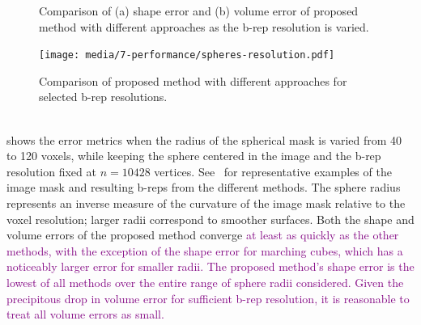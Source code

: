 \begin{figure}[]
\centering
{}
%	
\caption{Comparison of (a) shape error and (b) volume error of proposed method with different approaches as the b-rep resolution is varied.}
\label{fig:graph1}
\end{figure}
\begin{figure}[ht!]
	\centering
	\texttt{[image: media/7-performance/spheres-resolution.pdf]}
	\caption{Comparison of proposed method with different approaches for selected b-rep resolutions.}
	\label{fig:demos1}
\end{figure} \\
%
 shows the error metrics when the radius of the spherical mask is varied from 40 to 120 voxels, while keeping the sphere centered in the image and the b-rep resolution fixed at $n = 10428$ vertices. See~ for representative examples of the image mask and resulting b-reps from the different methods. The sphere radius represents an inverse measure of the curvature of the image mask relative to the voxel resolution; larger radii correspond to smoother surfaces. Both the shape and volume errors of the proposed method converge \textcolor{purple}{at least as quickly as the other methods, with the exception of the shape error for marching cubes, which has a noticeably larger error for smaller radii. The proposed method's shape error is the lowest of all methods over the entire range of sphere radii considered. Given the precipitous drop in volume error for sufficient b-rep resolution, it is reasonable to treat all volume errors as small.}

